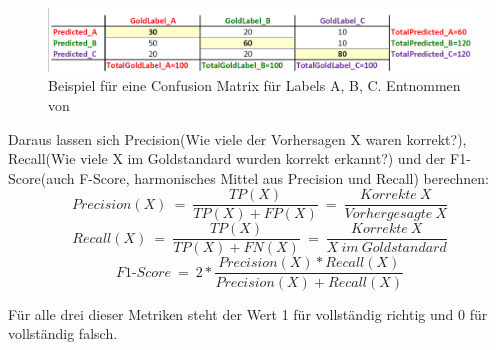 \begin{figure}[htb]
	\includegraphics[width=\textwidth]{gfx/multi-class-confusionmatrix.png}
	\caption{Beispiel für eine Confusion Matrix für Labels A, B, C. Entnommen von \cite{Web:rxnlp}}
	\label{fig:intro:pos:metrics:confusion}
\end{figure}

Daraus lassen sich Precision(Wie viele der Vorhersagen X waren korrekt?), Recall(Wie viele X im Goldstandard wurden korrekt erkannt?) und der F1-Score(auch F-Score, harmonisches Mittel aus Precision und Recall) berechnen:
\[ Precision(X) \: = \: \frac{TP(X)}{TP(X)+FP(X)}\: = \: \frac{Korrekte\:X}{Vorhergesagte\:X} \]
\[ Recall(X) \: = \: \frac{TP(X)}{TP(X)+FN(X)} \: = \: \frac{Korrekte\:X}{X\:im\:Goldstandard} \]
\[ F1\mbox{-}Score \: = \: 2*\frac{Precision(X)*Recall(X)}{Precision(X)+Recall(X)} \]

Für alle drei dieser Metriken steht der Wert 1 für vollständig richtig und 0 für vollständig falsch.




